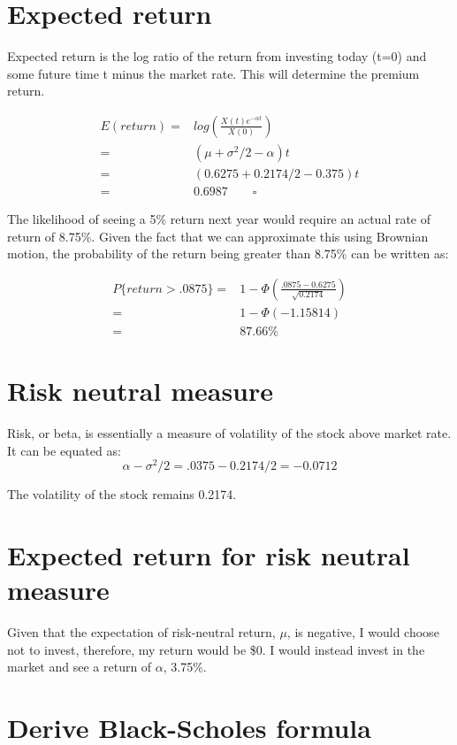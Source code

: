 \documentclass[]{article}
\begin{document}
\section{Expected return}
Expected return is the log ratio of the return from investing today (t=0) and some future time t minus the market rate. This will determine the premium return. 

\begin{align}
E(return) =& log(\frac{X(t)e^{-\alpha t}}{X(0)})\\
=& (\mu + \sigma^2/2 - \alpha)t\\
=& (0.6275+ 0.2174/2 - 0.375)t\\
=& 0.6987 \qquad \square
\end{align}

The likelihood of seeing a 5\% return next year would require an actual rate of return of 8.75\%. Given the fact that we can approximate this using Brownian motion, the probability of the return being greater than 8.75\% can be written as:

\begin{align}
P\{return > .0875\} =& 1-\Phi(\frac{.0875 - 0.6275}{\sqrt{ 0.2174}})\\
=& 1-\Phi(-1.15814)\\
=& 87.66\%
\end{align}

\section{Risk neutral measure}
Risk, or beta, is essentially a measure of volatility of the stock above market rate. It can be equated as:
$$\alpha - \sigma^2/2 = .0375 - 0.2174/2 = -0.0712$$

The volatility of the stock remains 0.2174.

\section{Expected return for risk neutral measure}
Given that the expectation of risk-neutral return, $\mu$, is negative, I would choose not to invest, therefore, my return would be \$0. I would instead invest in the market and see a return of $\alpha$, 3.75\%.

\section{Derive Black-Scholes formula}
\end{document}
